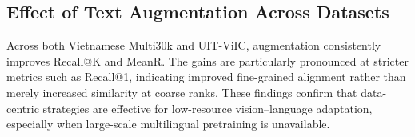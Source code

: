 \begin{table}[ht]
\centering
\caption{Ablation study of individual text augmentation techniques on Vietnamese Multi30k and UIT-ViIC.}
\label{tab:ablation}
\scriptsize
\setlength{\tabcolsep}{3pt} %
\renewcommand{\arraystretch}{1.1}
\end{table}


\subsection{Effect of Text Augmentation Across Datasets}

Across both Vietnamese Multi30k and UIT-ViIC, augmentation consistently improves Recall@K and MeanR. The gains are particularly pronounced at stricter metrics such as Recall@1, indicating improved fine-grained alignment rather than merely increased similarity at coarse ranks. These findings confirm that data-centric strategies are effective for low-resource vision--language adaptation, especially when large-scale multilingual pretraining is unavailable.

